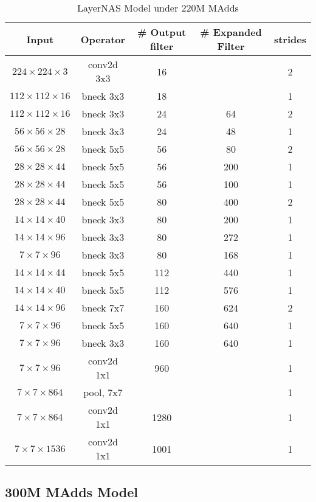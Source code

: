 \begin{table}
\caption{LayerNAS Model under 220M MAdds} 
\begin{center}

\begin{tabular}[hp]{c|c|c|c|c}
\hline
\hline
 Input &Operator  &\# Output filter &\# Expanded Filter &strides\\ 
\hline
 $224\times224\times3$ &conv2d 3x3 &16 & &2 \\
\hline
 $112\times112\times16$ &bneck 3x3 &18 & &1 \\
\hline
 $112\times112\times16$ &bneck 3x3 &24 &64 &2 \\
 $56\times56\times28$ &bneck 3x3 &24 &48 &1 \\
\hline
 $56\times56\times28$ &bneck 5x5 &56 &80 &2 \\
 $28\times28\times44$ &bneck 5x5 &56 &200 &1 \\
 $28\times28\times44$ &bneck 5x5 &56 &100 &1 \\
\hline
 $28\times28\times44$ &bneck 5x5 &80 &400 &2 \\
 $14\times14\times40$ &bneck 3x3 &80 &200 &1 \\
 $14\times14\times96$ &bneck 3x3 &80 &272 &1 \\
 $7\times7\times96$ &bneck 3x3 &80 &168 &1 \\
 \hline
 $14\times14\times44$ &bneck 5x5 &112 &440 &1 \\
 $14\times14\times40$ &bneck 5x5 &112 &576 &1 \\
 \hline
 $14\times14\times96$ &bneck 7x7 &160 &624 &2 \\
 $7\times7\times96$ &bneck 5x5 &160 &640 &1 \\
 $7\times7\times96$ &bneck 3x3 &160 &640 &1 \\
\hline
 $7\times7\times96$ &conv2d 1x1 &960 & &1 \\
 $7\times7\times864$ &pool, 7x7  & & &1\\
 $7\times7\times864$ &conv2d 1x1  &1280 & &1 \\
 $7\times7\times1536$ &conv2d 1x1 &1001 & &1 \\
\hline
\hline

\end{tabular}
\end{center}
\end{table}



\subsection{300M MAdds Model}



